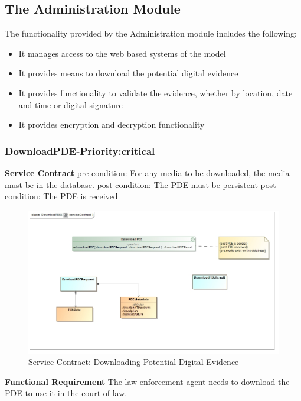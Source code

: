 \documentclass[a4paper,12pt]{article}
\begin{document}
\subsection{The Administration Module}
The functionality provided by the Administration module includes the following:
\begin{itemize}
\item It manages access to the web based systems of the model
\item It provides means to download the potential digital evidence
\item It provides functionality to validate the evidence, whether by location, date and time or digital signature
\item It provides encryption and decryption functionality
\end{itemize}
\subsubsection{DownloadPDE-Priority:critical}
\textbf{Service Contract}\newline
pre-condition: For any media to be downloaded, the media must be in the database.\newline
post-condition: The PDE must be persistent\newline
post-condition: The PDE is received\newline
\begin{figure}[H]
\includegraphics[width=1.0\textwidth]{images/downloadserviceContract.jpg}
\caption{Service Contract: Downloading Potential Digital Evidence \label{overflow}}
\end{figure}
\textbf{Functional Requirement}\newline
	The law enforcement agent needs to download the PDE to use it in the court of law. \newpage
\end{document}

